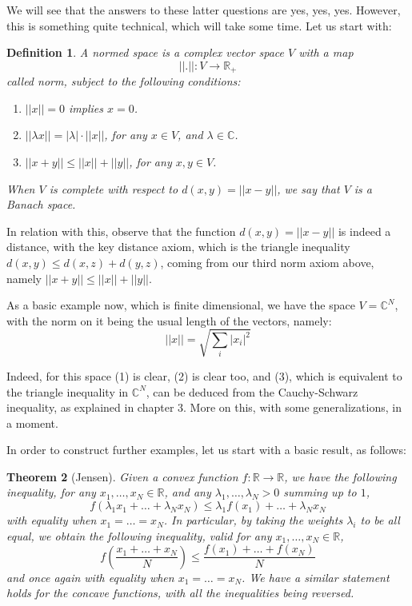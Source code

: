 \documentclass[12pt]{amsbook}
\newtheorem{theorem}{Theorem}[chapter]
\newtheorem{definition}[theorem]{Definition}
\begin{document}
We will see that the answers to these latter questions are yes, yes, yes. However, this is something quite technical, which will take some time. Let us start with:

\begin{definition}
A normed space is a complex vector space $V$ with a map
$$||.||:V\to\mathbb R_+$$
called norm, subject to the following conditions:
\begin{enumerate}
\item $||x||=0$ implies $x=0$.

\item $||\lambda x||=|\lambda|\cdot||x||$, for any $x\in V$, and $\lambda\in\mathbb C$.

\item $||x+y||\leq||x||+||y||$, for any $x,y\in V$.
\end{enumerate}
When $V$ is complete with respect to $d(x,y)=||x-y||$, we say that $V$ is a Banach space.
\end{definition}

In relation with this, observe that the function $d(x,y)=||x-y||$ is indeed a distance, with the key distance axiom, which is the triangle inequality $d(x,y)\leq d(x,z)+d(y,z)$, coming from our third norm axiom above, namely $||x+y||\leq||x||+||y||$.

\bigskip

As a basic example now, which is finite dimensional, we have the space $V=\mathbb C^N$, with the norm on it being the usual length of the vectors, namely:
$$||x||=\sqrt{\sum_i|x_i|^2}$$

Indeed, for this space (1) is clear, (2) is clear too, and (3), which is equivalent to the triangle inequality in $\mathbb C^N$, can be deduced from the Cauchy-Schwarz inequality, as explained in chapter 3. More on this, with some generalizations, in a moment.

\bigskip

In order to construct further examples, let us start with a basic result, as follows:

\begin{theorem}[Jensen]
Given a convex function $f:\mathbb R\to\mathbb R$, we have the following inequality, for any $x_1,\ldots,x_N\in\mathbb R$, and any $\lambda_1,\ldots,\lambda_N>0$ summing up to $1$,
$$f(\lambda_1x_1+\ldots+\lambda_Nx_N)\leq\lambda_1f(x_1)+\ldots+\lambda_Nx_N$$
with equality when $x_1=\ldots=x_N$. In particular, by taking the weights $\lambda_i$ to be all equal, we obtain the following inequality, valid for any $x_1,\ldots,x_N\in\mathbb R$,
$$f\left(\frac{x_1+\ldots+x_N}{N}\right)\leq\frac{f(x_1)+\ldots+f(x_N)}{N}$$
and once again with equality when $x_1=\ldots=x_N$. We have a similar statement holds for the concave functions, with all the inequalities being reversed.
\end{theorem}
\end{document}
